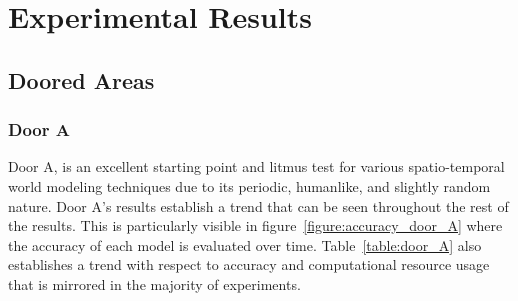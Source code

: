 

\chapter{Experimental Results}

\section{ Doored Areas }

\subsection { Door A }

Door A, is an excellent starting point and litmus test for various spatio-temporal
world modeling techniques due to its periodic, humanlike, and slightly random nature.
Door A's results establish a trend that can be seen
throughout the rest of the results. This is particularly visible in figure~\ref{figure:accuracy_door_A}
where the accuracy of each model is evaluated over time. Table~\ref{table:door_A}
also establishes a trend with respect to accuracy and computational resource
usage that is mirrored in the majority of experiments.\\

\begin{table}[h!]
  \centering
  \caption{Door A Data Overview}
  \label{table:door_A}
\end{table}

